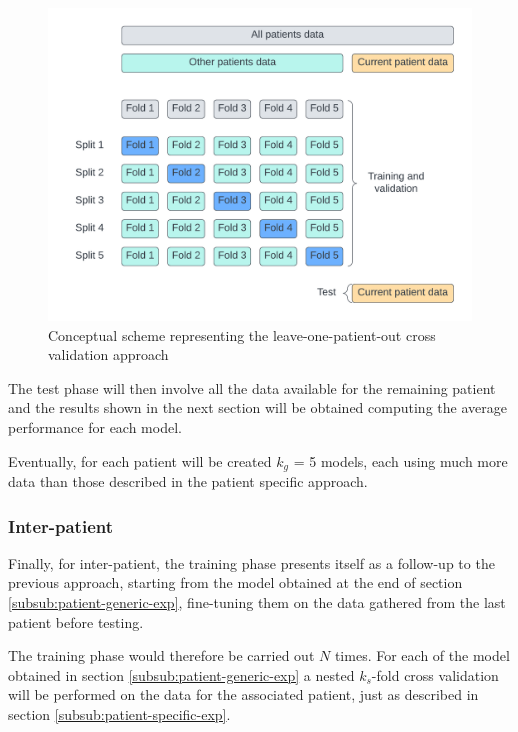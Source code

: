 \begin{figure}[ht]
    \centering
    \includegraphics[width=1.0\textwidth]{images/Experimental-validation/leave-one-patient-out.png}
    \caption{Conceptual scheme representing the leave-one-patient-out cross validation approach \cite{jacopo_repossi_tutorial_2022}}
    \label{fig:leave-one-patient-out}
\end{figure}

The test phase will then involve all the data available for the remaining patient and the results shown in the next section will be obtained computing the average performance for each model.

Eventually, for each patient will be created $k_g$ = 5 models, each using much more data than those described in the patient specific approach.

\subsubsection{Inter-patient}  \label{subsub:inter-patient-exp}
Finally, for inter-patient, the training phase presents itself as a follow-up to the previous approach, starting from the model obtained at the end of section  \ref{subsub:patient-generic-exp}, fine-tuning them on the data gathered from the last patient before testing.

The training phase would therefore be carried out $N$ times. For each of the model obtained in section \ref{subsub:patient-generic-exp} a nested $k_s$-fold cross validation will be performed on the data for the associated patient, just as described in section \ref{subsub:patient-specific-exp}.

